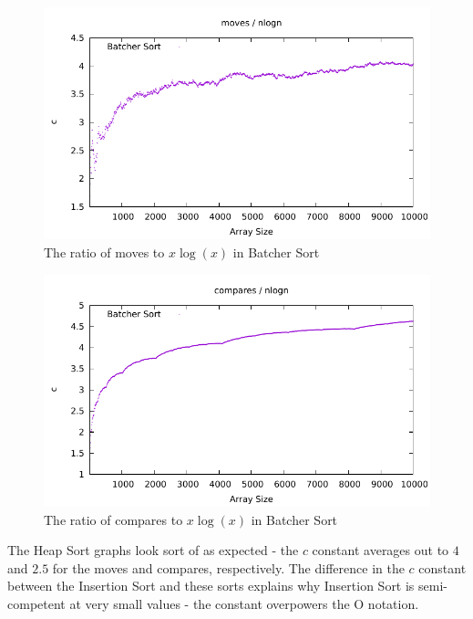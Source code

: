 \documentclass[12pt]{article}
\begin{document}
\begin{figure}[H]\begin{centering}
\includegraphics{plots/nlogn-moves-batcher.pdf}\caption{The ratio of moves to $x\log(x)$ in Batcher Sort}
\end{centering}\end{figure}
\begin{figure}[H]\begin{centering}
\includegraphics{plots/nlogn-compares-batcher.pdf}\caption{The ratio of compares to $x\log(x)$ in Batcher Sort}
\end{centering}\end{figure}

The Heap Sort graphs look sort of as expected - the $c$ constant averages out to $4$ and $2.5$ for the moves and compares, respectively. The difference in the $c$ constant between the Insertion Sort and these sorts explains why Insertion Sort is semi-competent at very small values - the constant overpowers the O notation.
\end{document}
